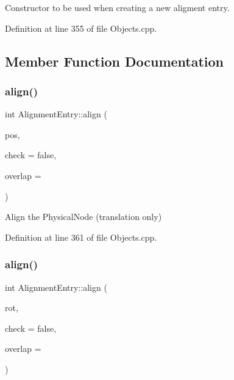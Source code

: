 Constructor to be used when creating a new aligment entry. 



Definition at line 355 of file Objects.\+cpp.



\subsection{Member Function Documentation}
\hypertarget{class_d_d4hep_1_1_geometry_1_1_alignment_entry_aea159236f1998b0b4ed084d9b33d9179}{}\label{class_d_d4hep_1_1_geometry_1_1_alignment_entry_aea159236f1998b0b4ed084d9b33d9179} 
\subsubsection{\texorpdfstring{align()}{align()}\hspace{0.1cm}{\footnotesize\ttfamily [1/3]}}
{\footnotesize\ttfamily int Alignment\+Entry\+::align (\begin{DoxyParamCaption}\item[{const \hyperlink{namespace_d_d4hep_1_1_geometry_a55083902099d03506c6db01b80404900}{Position} \&}]{pos,  }\item[{bool}]{check = {\ttfamily false},  }\item[{double}]{overlap = {} }\end{DoxyParamCaption})}



Align the Physical\+Node (translation only) 



Definition at line 361 of file Objects.\+cpp.

\hypertarget{class_d_d4hep_1_1_geometry_1_1_alignment_entry_af2e1c4e25b729271106064e912de2645}{}\label{class_d_d4hep_1_1_geometry_1_1_alignment_entry_af2e1c4e25b729271106064e912de2645} 
\subsubsection{\texorpdfstring{align()}{align()}\hspace{0.1cm}{\footnotesize\ttfamily [2/3]}}
{\footnotesize\ttfamily int Alignment\+Entry\+::align (\begin{DoxyParamCaption}\item[{const \hyperlink{namespace_d_d4hep_1_1_geometry_a24667b2b9c3cec3d5239828db4d52189}{Rotation\+Z\+YX} \&}]{rot,  }\item[{bool}]{check = {\ttfamily false},  }\item[{double}]{overlap = {} }\end{DoxyParamCaption})}




